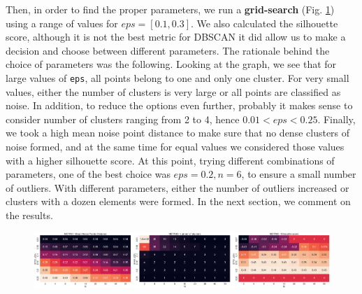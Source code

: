 Then, in order to find the proper parameters, we run a \textbf{grid-search} (Fig. \ref{fig:dbscan_metrics}) using a range of values for $eps=[0.1, 0.3]$. We also calculated the silhouette score, although it is not the best metric for DBSCAN it did allow us to make a decision and choose between different parameters. The rationale behind the choice of parameters was the following. Looking at the graph, we see that for large values of \verb|eps|, all points belong to one and only one cluster. For very small values, either the number of clusters is very large or all points are classified as noise. In addition, to reduce the options even further, probably it makes sense to consider number of clusters ranging from 2 to 4, hence $0.01 < eps < 0.25$. Finally, we took a high mean noise point distance to make sure that no dense clusters of noise formed, and at the same time for equal values we considered those values with a higher silhouette score. At this point, trying different combinations of parameters, one of the best choice was $eps=0.2, n=6$, to ensure a small number of outliers. With different parameters, either the number of outliers increased or clusters with a dozen elements were formed. In the next section, we comment on the results.


\begin{figure}[h]
	\centering
	\includegraphics[width=\textwidth]{plots/dbscan/dbscan_metrics}
	\label{fig:dbscan_metrics}
\end{figure}

